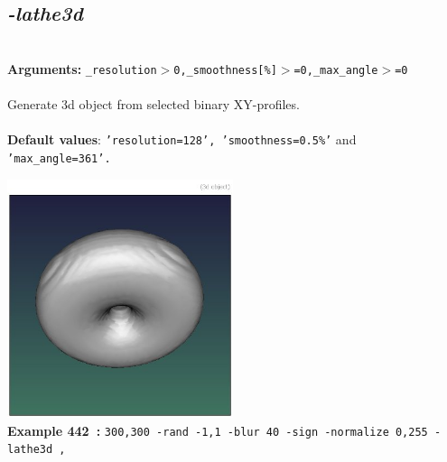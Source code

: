 \documentclass[a4paper,11pt,twoside]{book}
\begin{document}
\subsection{\emph{-lathe3d} }\vspace*{-0.5em}
~\\\textbf{Arguments: } 
{\small \texttt{\_resolution$>$0,\_smoothness[\%]$>$=0,\_max\_angle$>$=0}}\\~\\
Generate 3d object from selected binary XY-profiles.
~\\~\\\textbf{Default values}: {\small \texttt{'resolution=128', 'smoothness=0.5\%'} and \texttt{'max\_angle=361'.}}
\begin{center}\includegraphics[keepaspectratio=true,height=7cm,width=\textwidth]{img/gmic_def442.jpg}\\
{\footnotesize \textbf{Example 442~:} \texttt{300,300 -rand -1,1 -blur 40 -sign -normalize 0,255 -lathe3d ,}}
\end{center}
\end{document}
